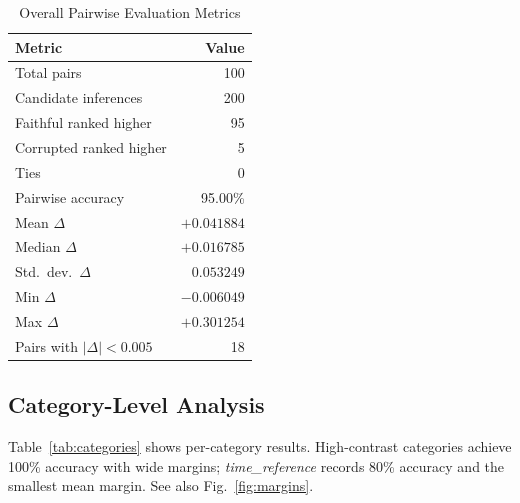 \documentclass[conference]{IEEEtran}
\begin{document}
\begin{table}[h]
\caption{Overall Pairwise Evaluation Metrics}
\label{tab:overall}
\centering
\begin{tabular}{lr}
\toprule
\textbf{Metric} & \textbf{Value} \\\midrule
Total pairs & 100 \\
Candidate inferences & 200 \\
Faithful ranked higher & 95 \\
Corrupted ranked higher & 5 \\
Ties & 0 \\
Pairwise accuracy & 95.00\% \\
Mean $\Delta$ & $+0.041884$ \\
Median $\Delta$ & $+0.016785$ \\
Std.\ dev.\ $\Delta$ & $0.053249$ \\
Min $\Delta$ & $-0.006049$ \\
Max $\Delta$ & $+0.301254$ \\
Pairs with $|\Delta|{<}0.005$ & 18 \\
\bottomrule
\end{tabular}
\end{table}

\subsection{Category-Level Analysis}
Table~\ref{tab:categories} shows per-category results.
High-contrast categories achieve 100\% accuracy with wide margins;
\textit{time\_reference} records 80\% accuracy and the smallest mean margin.
See also Fig.~\ref{fig:margins}.

\begin{table}[h]
\caption{Category-Level Pairwise Results}
\label{tab:categories}
\centering
{}
\end{table}
\end{document}
